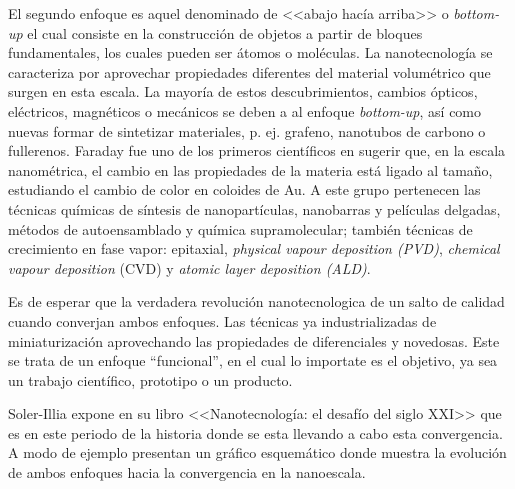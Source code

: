 
	El segundo enfoque es aquel denominado de <<abajo hacía arriba>> o \textit{bottom-up} el cual consiste en la construcción de objetos a partir de bloques fundamentales, los cuales pueden ser átomos o moléculas. La nanotecnología se caracteriza por aprovechar propiedades diferentes del material volumétrico que surgen en esta escala. La mayoría de estos descubrimientos, cambios ópticos, eléctricos, magnéticos o mecánicos se deben a al enfoque \textit{bottom-up}, así como nuevas formar de sintetizar materiales, p. ej. grafeno, nanotubos de carbono o fullerenos. Faraday fue uno de los primeros científicos en sugerir que, en la escala nanométrica, el cambio en las propiedades de la materia está ligado al tamaño, estudiando el cambio de color en coloides de Au\cite{faraday1857}. A este grupo pertenecen las técnicas químicas de síntesis de nanopartículas, nanobarras y películas delgadas, métodos de autoensamblado y química supramolecular; también técnicas de crecimiento en fase vapor: epitaxial, \textit{physical vapour deposition (PVD)}, \textit{chemical vapour deposition} (CVD) y \textit{atomic layer deposition (ALD)}.
			
	Es de esperar que la verdadera revolución nanotecnologica de un salto de calidad cuando converjan ambos enfoques. Las técnicas ya industrializadas de miniaturización aprovechando las propiedades de diferenciales y novedosas. Este se trata de un enfoque ``funcional'', en el cual lo importate es el objetivo, ya sea un trabajo científico, prototipo o un producto.

	Soler-Illia expone en su libro <<Nanotecnología: el desafío del siglo XXI>>\cite{nanotecnologia-galo} que es en este periodo de la historia donde se esta llevando a cabo esta convergencia. A modo de ejemplo presentan un gráfico esquemático donde muestra la evolución de ambos enfoques hacia la convergencia en la nanoescala.

